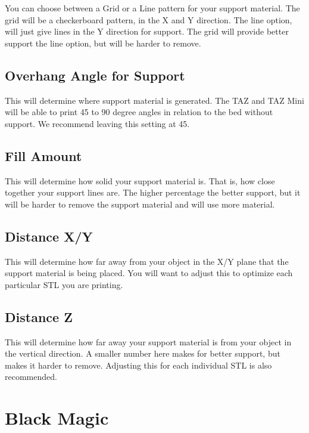 You can choose between a Grid or a Line pattern for your support material. The grid will be a checkerboard pattern, in the X and Y direction. The line option, will just give lines in the Y direction for support. The grid will provide better support the line option, but will be harder to remove.

\subsection{Overhang Angle for Support}

This will determine where support material is generated. The TAZ and TAZ Mini will be able to print 45 to 90 degree angles in relation to the bed without support. We recommend leaving this setting at 45.

\subsection{Fill Amount}

This will determine how solid your support material is. That is, how close together your support lines are. The higher percentage the better support, but it will be harder to remove the support material and will use more material.

\subsection{Distance X/Y}

This will determine how far away from your object in the X/Y plane that the support material is being placed. You will want to adjust this to optimize each particular STL you are printing.

\subsection{Distance Z}

This will determine how far away your support material is from your object in the vertical direction. A smaller number here makes for better support, but makes it harder to remove. Adjusting this for each individual STL is also recommended.

\section{Black Magic}

